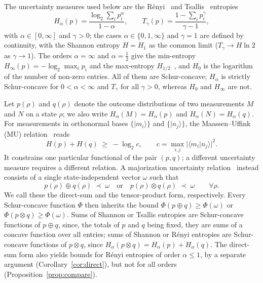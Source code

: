 \documentclass[aps,pra,twocolumn,superscriptaddress,nofootinbib,floatfix]{revtex4-2}
\theoremstyle{definition}
\newcommand{\ket}[1]{|#1\rangle}
\newcommand{\maj}{\prec}
\begin{document}
The uncertainty measures used below are the R\'enyi~\cite{Renyi1961} and
Tsallis~\cite{Tsallis1988} entropies
\begin{equation}
  H_\alpha(p)=\frac{\log_2\sum_ip_i^\alpha}{1-\alpha},\qquad
  T_\gamma(p)=\frac{1-\sum_ip_i^\gamma}{\gamma-1},
  \label{eq:entropies}
\end{equation}
with $\alpha\in[0,\infty]$ and $\gamma>0$; the cases $\alpha\in\{0,1,\infty\}$ and
$\gamma=1$ are defined by continuity, with the Shannon entropy $H=H_1$ as the
common limit ($T_\gamma\to H\ln2$ as $\gamma\to1$). The orders $\alpha=\infty$ and
$\alpha=\frac12$ give the min-entropy $H_\infty(p)=-\log_2\max_ip_i$ and the
max-entropy $H_{1/2}$~\cite{KRS2009}, and $H_0$ is the logarithm of the number of
non-zero entries.
All of them are Schur-concave; $H_\alpha$ is strictly Schur-concave for
$0<\alpha<\infty$ and $T_\gamma$ for all $\gamma>0$, whereas $H_0$ and $H_\infty$
are not.

Let $p(\rho)$ and $q(\rho)$ denote the outcome distributions of two
measurements $M$ and $N$ on a state $\rho$; we also write $H_\alpha(M)=H_\alpha(p)$
and $H_\alpha(N)=H_\alpha(q)$. For measurements in orthonormal
bases $\{\ket{m_i}\}$ and $\{\ket{n_j}\}$, the Maassen--Uffink (MU)
relation~\cite{MaassenUffink1988} reads
\begin{equation}
  H(p)+H(q)\;\geq\;-\log_2 c,\qquad c=\max_{i,j}|\langle m_i|n_j\rangle|^2 .
  \label{eq:MU}
\end{equation}
It constrains one particular functional of the pair $(p,q)$; a different
uncertainty measure requires a different relation. A majorization uncertainty
relation~\cite{Partovi2011,FGG2013,PRZ2013,RPZ2014} instead consists of a
single state-independent vector $\omega$ such that
\begin{equation}
  p(\rho)\oplus q(\rho)\;\maj\;\omega
  \quad\text{or}\quad
  p(\rho)\otimes q(\rho)\;\maj\;\omega
  \qquad\forall\rho .
  \label{eq:maj-UR}
\end{equation}
We call these the direct-sum and the tensor-product form, respectively. Every
Schur-concave function $\Phi$ then inherits the bound
$\Phi(p\oplus q)\ge\Phi(\omega)$ or $\Phi(p\otimes q)\ge\Phi(\omega)$.
Sums of Shannon or Tsallis entropies are Schur-concave functions of $p\oplus q$,
since, the totals of $p$ and $q$ being fixed, they are sums of a concave
function over all entries; sums of Shannon or R\'enyi entropies are
Schur-concave functions of $p\otimes q$, since
$H_\alpha(p\otimes q)=H_\alpha(p)+H_\alpha(q)$. The direct-sum form also yields
bounds for R\'enyi entropies of order $\alpha\le1$, by a separate argument
(Corollary~\ref{cor:direct}), but not for all orders
(Proposition~\ref{prop:compare}).
\end{document}
